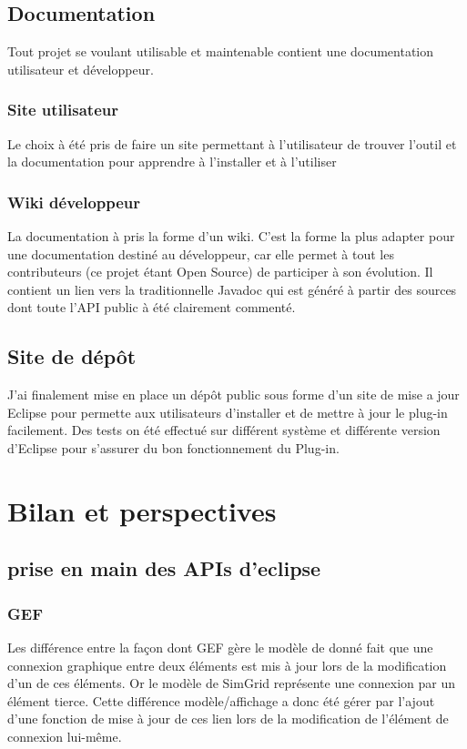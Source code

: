 \documentclass{article}
\begin{document}
    \subsection{Documentation}
    Tout projet se voulant utilisable et maintenable contient une documentation utilisateur et développeur.
        \subsubsection{Site utilisateur}
        Le choix à été pris de faire un site permettant à l'utilisateur de trouver l'outil et la documentation pour apprendre à l'installer et à l'utiliser 
        \subsubsection{Wiki développeur}
        La documentation à pris la forme d'un wiki. C'est la forme la plus adapter pour une documentation destiné au développeur, car elle permet à tout les contributeurs (ce projet étant Open Source) de participer à son évolution. Il contient un lien vers la traditionnelle Javadoc qui est généré à partir des sources dont toute l'API public à été clairement commenté.
    \subsection{Site de dépôt}
    J'ai finalement mise en place un dépôt public sous forme d'un site de mise a jour Eclipse pour permette aux utilisateurs d'installer et de mettre à jour le plug-in facilement. Des tests on été effectué sur différent système et différente version d'Eclipse pour s'assurer du bon fonctionnement du Plug-in.


\section{Bilan et perspectives}
    \subsection{prise en main des APIs d'eclipse}
        \subsubsection{GEF}
        Les différence entre la façon dont GEF gère le modèle de donné fait que une connexion graphique entre deux éléments est mis à jour lors de la modification d'un de ces éléments. Or le modèle de SimGrid représente une connexion par un élément tierce. Cette différence modèle/affichage a donc été gérer par l'ajout d'une fonction de mise à jour de ces lien lors de la modification de l'élément de connexion lui-même.
\end{document}
